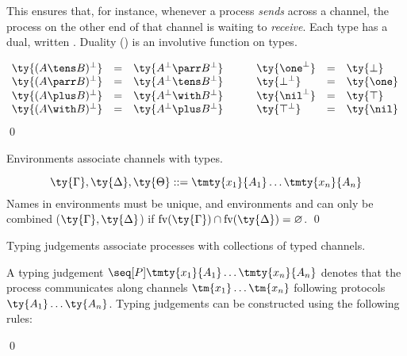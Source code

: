 \documentclass[UKenglish]{llncs}
\begin{document}
This ensures that, for instance, whenever a process \emph{sends} across a
channel, the process on the other end of that channel is waiting to
\emph{receive}.
Each type  has a dual, written .
Duality (\ty{\cdot^\bot}) is an involutive function on types.
\begin{definition}[Duality]\label{def:cp-negation}
  \[\!
    \begin{array}{lclclcl}
              \ty{(A \tens B)^\bot} &=& \ty{A^\bot \parr B^\bot}
      &\quad& \ty{\one^\bot}        &=& \ty{\bot}
      \\      \ty{(A \parr B)^\bot} &=& \ty{A^\bot \tens B^\bot}
      &\quad& \ty{\bot^\bot}        &=& \ty{\one}
      \\      \ty{(A \plus B)^\bot} &=& \ty{A^\bot \with B^\bot}
      &\quad& \ty{\nil^\bot}        &=& \ty{\top}
      \\      \ty{(A \with B)^\bot} &=& \ty{A^\bot \plus B^\bot}
      &\quad& \ty{\top^\bot}        &=& \ty{\nil}
    \end{array}
  \]
  \qed
\end{definition}
Environments associate channels with types.
\begin{definition}[Environments]\label{def:cp-environments}
  \[
    \ty{\Gamma}, \ty{\Delta}, \ty{\Theta}
    ::= \tmty{x_1}{A_1}\dots\tmty{x_n}{A_n}
  \] 
  Names in environments must be unique, and environments \ty{\Gamma} and
  \ty{\Delta} can only be combined ($\ty{\Gamma}, \ty{\Delta}$) if
  $\text{fv}(\ty{\Gamma}) \cap \text{fv}(\ty{\Delta}) = \varnothing$. 
  \qed
\end{definition}
Typing judgements associate processes with collections of typed channels.
\begin{definition}\label{def:cp-typing-judgement}
  A typing judgement $\seq[{ P }]{\tmty{x_1}{A_1}\dots\tmty{x_n}{A_n}}$ denotes
  that the process  communicates along channels $\tm{x_1}\dots\tm{x_n}$
  following protocols $\ty{A_1}\dots\ty{A_n}$.
  Typing judgements can be constructed using the following rules:
  {\normalfont
    \begin{center} \cpInfAx    \cpInfCut   \end{center}
    \begin{center} \cpInfTens  \cpInfParr  \end{center}
    \begin{center} \cpInfOne   \cpInfBot   \end{center}
    \begin{center}   \end{center}
    \begin{center} \cpInfWith              \end{center}
    \begin{center} \cpInfNil   \cpInfTop   \end{center}
  }
  \qed
\end{definition}
\end{document}
